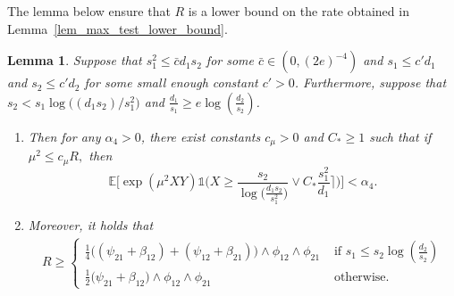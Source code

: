 \documentclass{article}
\newcommand{\EE}{\mathbb{E}}
\newcommand{\one}{\mathds{1}}
\newcommand{\Ct}{C_{*}}
\newtheorem{lemma}{Lemma}
\theoremstyle{remark}
\begin{document}
The lemma below ensure that $R$ is a lower bound on the rate obtained in Lemma~\ref{lem_max_test_lower_bound}.
\begin{lemma}\label{lem_simplification_rate_max_test}
    Suppose that $s_1^2 \leq \bar{c}d_1s_2$ for some $\bar{c} \in (0,(2e)^{-4})$ and $s_1 \leq c'd_1$ and $s_2 \leq c' d_2$ for some small enough constant $c'>0$. Furthermore, suppose that $s_2 < s_1\log\big((d_1s_2)/s_1^2\big)$ and $\frac{d_1}{s_1} \geq e \log\left(\frac{d_2}{s_2}\right)$. 
    \begin{enumerate}
        \item Then for any $\alpha_4 > 0$, there exist constants $c_\mu > 0$ and $C_* \geq 1$ such that if $\mu^2 \leq c_\mu R,$ then 
    \[\EE\Big[\exp(\mu^2XY)\one\Big(X \geq \frac{s_2}{\log\big(\frac{d_1s_2}{s_1^2}\big)} \lor  \Ct \frac{s_1^2}{d_1}\Big\rceil\Big)\Big] < \alpha_4.\]
    \item Moreover, it holds that 
    \begin{align*}
        R \geq \begin{cases}
            \frac{1}{4}\big((\psi_{21}+\beta_{12}) + (\psi_{12} + \beta_{21})\big) \land \phi_{12} \land \phi_{21}& \text{ if } s_1 \leq s_2\log\left(\frac{d_2}{s_2}\right)\\
            \frac{1}{2}\big(\psi_{21} + \beta_{12}\big) \land \phi_{12} \land \phi_{21} & \text{ otherwise.}
        \end{cases}
    \end{align*}
    \end{enumerate}
\end{lemma}
\end{document}

